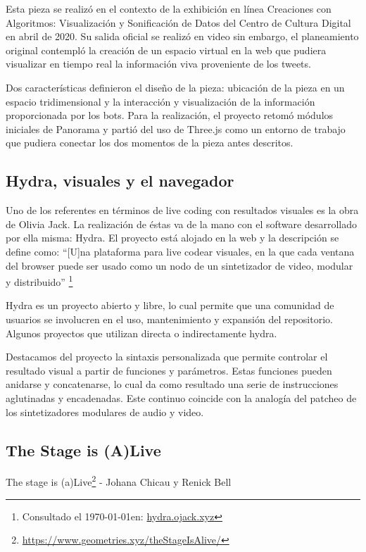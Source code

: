 Esta pieza se realizó en el contexto de la exhibición en línea Creaciones con Algoritmos: Visualización y Sonificación de Datos del Centro de Cultura Digital en abril de 2020. Su salida oficial se realizó en video sin embargo, el planeamiento original contempló la creación de un espacio virtual en la web que pudiera visualizar en tiempo real la información viva proveniente de los tweets.

Dos características definieron el diseño de la pieza: ubicación de la pieza en un espacio tridimensional y la interacción y visualización de la información proporcionada por los bots. Para la realización, el proyecto retomó módulos iniciales de Panorama y partió del uso de Three.js como un entorno de trabajo que pudiera conectar los dos momentos de la pieza antes descritos.

\subsection{Hydra, visuales y el navegador}

Uno de los referentes en términos de live coding con resultados visuales es la obra de Olivia Jack. La realización de éstas va de la mano con el software desarrollado por ella misma: Hydra. El proyecto está alojado en la web y la descripción se define como: ``[U]na plataforma para live codear visuales, en la que cada ventana del browser puede ser usado como un nodo de un sintetizador de video, modular y distribuido'' \footnote{Consultado el \today en: \url{hydra.ojack.xyz}}

Hydra es un proyecto abierto y libre, lo cual permite que una comunidad de usuarios se involucren en el uso, mantenimiento y expansión del repositorio. Algunos proyectos que utilizan directa o indirectamente hydra.

Destacamos del proyecto la sintaxis personalizada que permite controlar el resultado visual a partir de funciones y parámetros. Estas funciones pueden anidarse y concatenarse, lo cual da como resultado una serie de instrucciones aglutinadas y encadenadas. Este continuo coincide con la analogía del patcheo de los sintetizadores modulares de audio y video. 

\subsection{The Stage is (A)Live}

The stage is (a)Live\footnote{\url{https://www.geometries.xyz/theStageIsAlive/}} - Johana Chicau y Renick Bell

